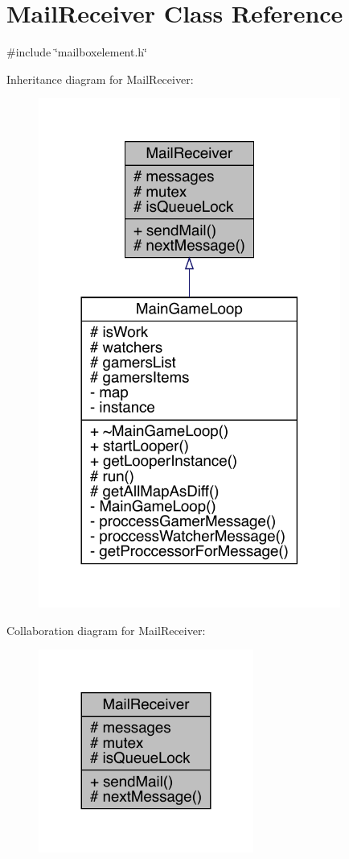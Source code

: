 \hypertarget{a00197}{}\section{Mail\+Receiver Class Reference}
\label{a00197}


{\ttfamily \#include \char`\"{}mailboxelement.\+h\char`\"{}}



Inheritance diagram for Mail\+Receiver\+:
\nopagebreak
\begin{figure}[H]
\begin{center}
\leavevmode
\includegraphics[width=281pt]{d7/ded/a00196}
\end{center}
\end{figure}


Collaboration diagram for Mail\+Receiver\+:
\nopagebreak
\begin{figure}[H]
\begin{center}
\leavevmode
\includegraphics[width=200pt]{d3/d2a/a00195}
\end{center}
\end{figure}
